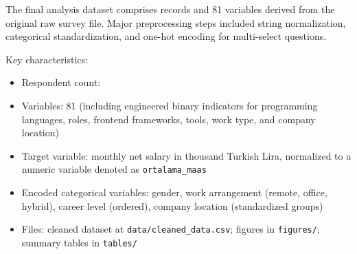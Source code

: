 The final analysis dataset comprises \SampleSize{} records and 81 variables derived from the original raw survey file. Major preprocessing steps included string normalization, categorical standardization, and one-hot encoding for multi-select questions.

Key characteristics:
\begin{itemize}[leftmargin=*]
  \item Respondent count: \SampleSize{}
  \item Variables: 81 (including engineered binary indicators for programming languages, roles, frontend frameworks, tools, work type, and company location)
  \item Target variable: monthly net salary in thousand Turkish Lira, normalized to a numeric variable denoted as \texttt{ortalama\_maas}
  \item Encoded categorical variables: gender, work arrangement (remote, office, hybrid), career level (ordered), company location (standardized groups)
  \item Files: cleaned dataset at \texttt{data/cleaned\_data.csv}; figures in \texttt{figures/}; summary tables in \texttt{tables/}
\end{itemize}
